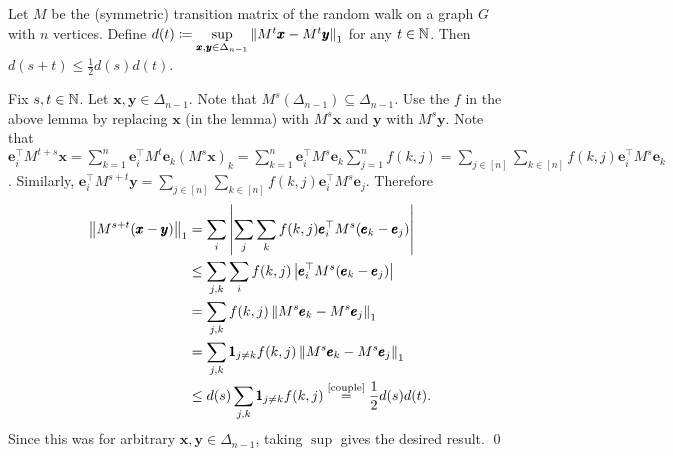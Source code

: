 \begin{cor}\label{cor}
Let $M$ be the (symmetric) transition matrix of the random walk on a graph $G$ with $n$ vertices. Define $d(t) \coloneqq \sup\limits_{\pmb x,\pmb y\in\Delta_{n-1}}\left\lVert M^{t}\pmb x-M^{t}\pmb y \right\rVert_{1}$ for any $t\in\mathbb{N}$. Then $d(s+t) \le \frac12d(s)d(t)$.
\end{cor}
\begin{pf}
Fix $s,t\in\mathbb{N}$. Let $\pmb x,\pmb y\in \Delta_{n-1}$. Note that $M^{s}(\Delta_{n-1})\subseteq \Delta_{n-1}$. Use the $f$ in the above lemma by replacing $\pmb x$ (in the lemma) with $M^{s}\pmb x$ and $\pmb y$ with $M^{s}\pmb y$. Note that $\pmb e_{i}^{\top}M^{t+s}\pmb x = \sum\limits_{k=1}^{n}\pmb e_{i}^{\top}M^{t}\pmb e_{k}(M^{s}\pmb x)_{k} = \sum\limits_{k=1}^{n}\pmb e_{i}^{\top}M^{s}\pmb e_{k}\sum\limits_{j=1}^{n}f(k,j) = \sum\limits_{j\in[n]}\sum\limits_{k\in[n]}f(k,j) \pmb e_{i}^{\top}M^{s}\pmb e_{k}$. Similarly, $\pmb e_{i}^{\top}M^{s+t}\pmb y = \sum\limits_{j\in[n]}\sum\limits_{k\in[n]}f(k,j) \pmb e_{i}^{\top}M^{s}\pmb e_{j}$. Therefore 
\begin{align*}
\norm{M^{s+t}(\pmb x-\pmb y)}{1} &= \sum_{i} \abs{\sum\limits_{j}\sum\limits_{k} f(k,j)\pmb e_{i}^{\top}M^{s}(\pmb e_{k}-\pmb e_{j})}\\
&\le \sum_{j,k}\sum_{i} f(k,j) \abs{\pmb e_{i}^{\top}M^{s}(\pmb e_{k}-\pmb e_{j})}\\
&= \sum_{j,k} f(k,j) \norm{M^{s}\pmb e_{k} - M^{s}\pmb e_{j}}{1}\\
&= \sum_{j,k} \pmb 1_{j\ne k} f(k,j) \norm{M^{s}\pmb e_{k} - M^{s}\pmb e_{j}}{1}\\
&\le d(s) \sum_{j,k} \pmb 1_{j\ne k} f(k,j) \stackrel{\text{\cref{couple}}}{=} \frac12 d(s)d(t).
\end{align*}
Since this was for arbitrary $\pmb x,\pmb y\in \Delta_{n-1}$, taking $\sup$ gives the desired result.
\qed\end{pf}

